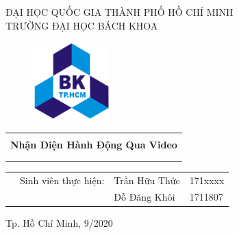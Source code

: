 \begin{titlepage}
\begin{center} \large 
ĐẠI HỌC QUỐC GIA THÀNH PHỐ HỒ CHÍ MINH \\
    TRƯỜNG ĐẠI HỌC BÁCH KHOA
\end{center}

\vspace{1.5cm}

\begin{figure}[h!]
\begin{center}
\includegraphics[width=3cm]{imgs/hcmut-logo.png}
\end{center}
\end{figure}

\vspace{1cm}

\begin{center}
\begin{tabular}{c}
\\ \hline \hline \\

{\bf \large Nhận Diện Hành Động Qua Video}\\

\\ \hline \hline \\
\end{tabular}
\end{center}

\vspace{1cm}

\begin{table}[h]
\begin{tabular}{rrll}
\hspace{2.8cm}
&   \large  Sinh viên thực hiện: 
&   \large Trần Hữu Thức  & \large 171xxxx\\
& & \large Đỗ Đăng Khôi      & \large 1711807\\

\end{tabular}
\end{table}

\vspace{2cm}

\begin{center}
{\large Tp. Hồ Chí Minh, 9/2020}
\end{center}
\end{titlepage}
